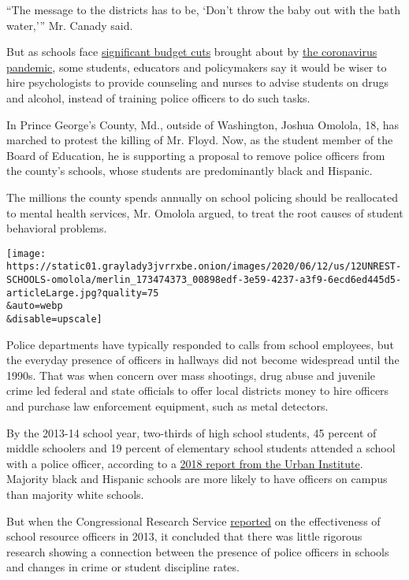 ``The message to the districts has to be, `Don't throw the baby out with
the bath water,''' Mr. Canady said.

But as schools face
\href{https://www.nytimes3xbfgragh.onion/2020/06/10/us/politics/virus-schools-funding-budget.html}{significant
budget cuts} brought about by
\href{https://www.nytimes3xbfgragh.onion/news-event/coronavirus}{the
coronavirus pandemic}, some students, educators and policymakers say it
would be wiser to hire psychologists to provide counseling and nurses to
advise students on drugs and alcohol, instead of training police
officers to do such tasks.

In Prince George's County, Md., outside of Washington, Joshua Omolola,
18, has marched to protest the killing of Mr. Floyd. Now, as the student
member of the Board of Education, he is supporting a proposal to remove
police officers from the county's schools, whose students are
predominantly black and Hispanic.

The millions the county spends annually on school policing should be
reallocated to mental health services, Mr. Omolola argued, to treat the
root causes of student behavioral problems.

\texttt{[image: https://static01.graylady3jvrrxbe.onion/images/2020/06/12/us/12UNREST-SCHOOLS-omolola/merlin\_173474373\_00898edf-3e59-4237-a3f9-6ecd6ed445d5-articleLarge.jpg?quality=75\\\&auto=webp\\\&disable=upscale]}

Police departments have typically responded to calls from school
employees, but the everyday presence of officers in hallways did not
become widespread until the 1990s. That was when concern over mass
shootings, drug abuse and juvenile crime led federal and state officials
to offer local districts money to hire officers and purchase law
enforcement equipment, such as metal detectors.

By the 2013-14 school year, two-thirds of high school students, 45
percent of middle schoolers and 19 percent of elementary school students
attended a school with a police officer, according to a
\href{https://www.urban.org/urban-wire/prevalence-police-officers-us-schools\#:~:text=In\%20every\%20state\%2C\%20high\%20school,school\%20with\%20a\%20police\%20officer.}{2018
report from the Urban Institute}. Majority black and Hispanic schools
are more likely to have officers on campus than majority white schools.

But when the Congressional Research Service
\href{https://fas.org/sgp/crs/misc/R43126.pdf}{reported} on the
effectiveness of school resource officers in 2013, it concluded that
there was little rigorous research showing a connection between the
presence of police officers in schools and changes in crime or student
discipline rates.

